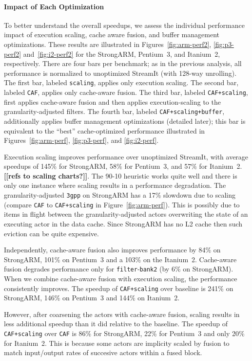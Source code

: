 \paragraph*{Impact of Each Optimization}
To better understand the overall speedups, we assess the individual
performance impact of execution scaling, cache aware fusion, and
buffer management optimizations.  These results are illustrated in
Figures~\ref{fig:arm-perf2}, \ref{fig:p3-perf2} and~\ref{fig:i2-perf2}
for the StrongARM, Pentium~3, and Itanium~2, respectively.  There are
four bars per benchmark; as in the previous analysis, all performance
is normalized to unoptimized StreamIt (with 128-way unrolling).  The
first bar, labeled {\tt scaling}, applies only execution scaling.  The
second bar, labeled {\tt CAF}, applies only cache-aware fusion.  The
third bar, labeled {\tt CAF+scaling}, first applies cache-aware fusion
and then applies execution-scaling to the granularity-adjusted
filters.  The fourth bar, labeled {\tt CAF+scaling+buffer},
additionally applies buffer management optimizations (detailed later);
this bar is equivalent to the ``best'' cache-optimized performance
illustrated in Figures~\ref{fig:arm-perf}, \ref{fig:p3-perf}, and
\ref{fig:i2-perf}.

Execution scaling improves performance over unoptimized StreamIt, with
average speedups of 145\% for StrongARM, 58\% for Pentium~3, and 57\%
for Itanium~2.  {\bf [[refs to scaling charts?]]}.  The 90-10
heuristic works quite well and there is only one instance where
scaling results in a performance degradation. The granularity-adjusted
\texttt{3gpp} on StrongARM has a 17\% slowdown due to scaling (compare
{\tt CAF} to {\tt CAF+scaling} in Figure~\ref{fig:arm-perf}).  This is
possibly due to items in flight between the granularity-adjusted
actors overwriting the state of an executing actor in the data cache.
Since StrongARM has no L2 cache then such eviction can be quite
expensive.

Independently, cache-aware fusion also improves performance by 
84\% on StrongARM, 101\% on Pentium~3 and a 103\% on the Itanium~2. 
Cache-aware fusion degrades performance only for
\texttt{filter}-\texttt{bank2} (by 6\% on StrongARM). When we combine
cache-aware fusion with execution scaling, the performance
consistently improves.  The speedup of \texttt{CAF+scaling} over
baseline is 241\% on StrongARM, 146\% on Pentium~3 and 144\% on
Itanium~2.

However, after coarsening the actors with cache-aware fusion, scaling
results in less additional speedup than it did relative to the
baseline.  The speedup of \texttt{CAF+scaling} over \texttt{CAF} is
86\% for StrongARM, 22\% for Pentium~3 and only 20\% for Itanium~2.
This is because some actors are implicity scaled by fusion to match
input/output rates of succesive actors within a fused block.

